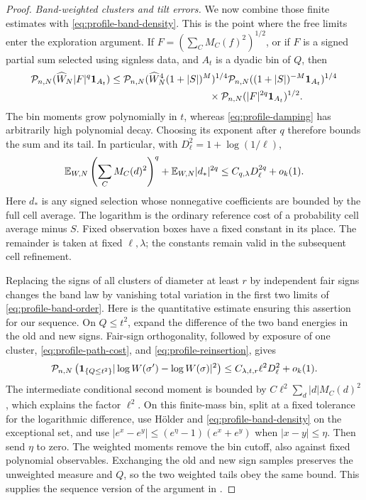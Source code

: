 \begin{proof}
\emph{Band-weighted clusters and tilt errors.}
We now combine those finite estimates with
\eqref{eq:profile-band-density}.  This is the point where the free
limits enter the exploration argument.  If
\(F=(\sum_CM_C(f)^2)^{1/2}\), or if \(F\) is a signed partial sum
selected using signless data,
and \(A_t\) is a dyadic bin of \(Q\), then
\begin{align*}
 \mathcal P_{n,N}(\widehat W_N|F|^q\one_{A_t})
 &\le
 \mathcal P_{n,N}(\widehat W_N^4(1+|S|)^M)^{1/4}
 \mathcal P_{n,N}((1+|S|)^{-M}\one_{A_t})^{1/4}\\
 &\hspace{35mm}\times
 \mathcal P_{n,N}(|F|^{2q}\one_{A_t})^{1/2}.
\end{align*}
The bin moments grow polynomially in \(t\), whereas
\eqref{eq:profile-damping} has arbitrarily high polynomial decay.
Choosing its exponent after \(q\) therefore bounds the sum and its
tail.  In particular, with \(D_\ell^2=1+\log(1/\ell)\),
\begin{equation}\label{eq:profile-weighted-moments}
 \mathbb E_{W,N}\left(\sum_CM_C(d)^2\right)^q
       +\mathbb E_{W,N}|d_*|^{2q}
        \le C_{q,\lambda}D_\ell^{2q}+o_k(1).
\end{equation}
Here \(d_*\) is any signed selection whose nonnegative coefficients
are bounded by the full cell average.  The logarithm is the ordinary
reference cost of a probability cell average minus \(S\).  Fixed
observation boxes have a fixed constant in its place.  The remainder
is taken at fixed \(\ell,\lambda\); the constants remain valid in
the subsequent cell refinement.

Replacing the signs of all clusters of diameter at least \(r\) by
independent fair signs changes the band law by vanishing total
variation in the first two limits of \eqref{eq:profile-band-order}.
Here is the quantitative estimate ensuring this assertion for our
sequence.  On \(Q\le t^2\), expand the difference of the two band
energies in the old and new signs.  Fair-sign orthogonality, followed
by exposure of one cluster, \eqref{eq:profile-path-cost}, and
\eqref{eq:profile-reinsertion}, gives
\begin{equation}\label{eq:profile-sign-error}
 \mathcal P_{n,N}\left(\mathbf 1_{\{Q\le t^2\}}
       |\log W(\sigma')-\log W(\sigma)|^2\right)
       \le C_{\lambda,t,r}\ell^2D_\ell^2+o_k(1).
\end{equation}
The intermediate conditional second moment is bounded by
\(C\ell^2\sum_d|d|M_C(d)^2\), which explains the factor
\(\ell^2\).  On this finite-mass bin, split at a fixed tolerance
for the logarithmic difference, use H\"older and
\eqref{eq:profile-band-density} on the exceptional set, and use
\(|e^x-e^y|\le(e^\eta-1)(e^x+e^y)\) when \(|x-y|\le\eta\).
Then send \(\eta\) to zero.  The weighted moments remove the bin
cutoff, also against fixed polynomial observables.  Exchanging the
old and new sign samples preserves the unweighted measure and \(Q\),
so the two weighted tails obey the same bound.  This supplies the
sequence version of the argument in \cite[Lemmas~3.6--3.7]{X}.


\end{proof}
